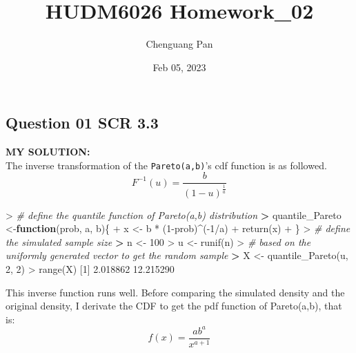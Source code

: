 \documentclass[
]{article}
\title{HUDM6026 Homework\_02}
\author{Chenguang Pan}
\date{Feb 05, 2023}
\newenvironment{Shaded}{\begin{snugshade}}{\end{snugshade}}
\newcommand{\CommentTok}[1]{\textcolor[rgb]{0.56,0.35,0.01}{\textit{#1}}}
\newcommand{\ControlFlowTok}[1]{\textcolor[rgb]{0.13,0.29,0.53}{\textbf{#1}}}
\newcommand{\DecValTok}[1]{\textcolor[rgb]{0.00,0.00,0.81}{#1}}
\newcommand{\ErrorTok}[1]{\textcolor[rgb]{0.64,0.00,0.00}{\textbf{#1}}}
\newcommand{\FloatTok}[1]{\textcolor[rgb]{0.00,0.00,0.81}{#1}}
\newcommand{\FunctionTok}[1]{\textcolor[rgb]{0.00,0.00,0.00}{#1}}
\newcommand{\NormalTok}[1]{#1}
\newcommand{\OtherTok}[1]{\textcolor[rgb]{0.56,0.35,0.01}{#1}}
\newcommand{\SpecialCharTok}[1]{\textcolor[rgb]{0.00,0.00,0.00}{#1}}
\begin{document}
\maketitle

\hypertarget{question-01-scr-3.3}{%
\subsection{Question 01 SCR 3.3}\label{question-01-scr-3.3}}

\textbf{MY SOLUTION:}\\
The inverse transformation of the \texttt{Pareto(a,b)}'s cdf function is
as followed. \[F^{-1}(u)=\frac{b}{(1-u)^\frac{1}{a}} \]

\begin{Shaded}
\begin{Highlighting}[]
\SpecialCharTok{\textgreater{}} \CommentTok{\# define the quantile function of Pareto(a,b) distribution}
\ErrorTok{\textgreater{}}\NormalTok{ quantile\_Pareto }\OtherTok{\textless{}{-}}\ControlFlowTok{function}\NormalTok{(prob, a, b)\{}
\SpecialCharTok{+}\NormalTok{   x }\OtherTok{\textless{}{-}}\NormalTok{ b }\SpecialCharTok{*}\NormalTok{ (}\DecValTok{1}\SpecialCharTok{{-}}\NormalTok{prob)}\SpecialCharTok{\^{}}\NormalTok{(}\SpecialCharTok{{-}}\DecValTok{1}\SpecialCharTok{/}\NormalTok{a)}
\SpecialCharTok{+}   \FunctionTok{return}\NormalTok{(x)}
\SpecialCharTok{+}\NormalTok{ \}}
\SpecialCharTok{\textgreater{}} \CommentTok{\# define the simulated sample size}
\ErrorTok{\textgreater{}}\NormalTok{ n }\OtherTok{\textless{}{-}} \DecValTok{100}
\SpecialCharTok{\textgreater{}}\NormalTok{ u }\OtherTok{\textless{}{-}} \FunctionTok{runif}\NormalTok{(n)}
\SpecialCharTok{\textgreater{}} \CommentTok{\# based on the uniformly generated vector to get the random sample}
\ErrorTok{\textgreater{}}\NormalTok{ X }\OtherTok{\textless{}{-}} \FunctionTok{quantile\_Pareto}\NormalTok{(u, }\DecValTok{2}\NormalTok{, }\DecValTok{2}\NormalTok{)}
\SpecialCharTok{\textgreater{}} \FunctionTok{range}\NormalTok{(X)}
\NormalTok{[}\DecValTok{1}\NormalTok{]  }\FloatTok{2.018862} \FloatTok{12.215290}
\end{Highlighting}
\end{Shaded}

This inverse function runs well. Before comparing the simulated density
and the original density, I derivate the CDF to get the pdf function of
Pareto(a,b), that is:\[f(x)=\frac{ab^a}{x^{a+1}}\]
\end{document}
